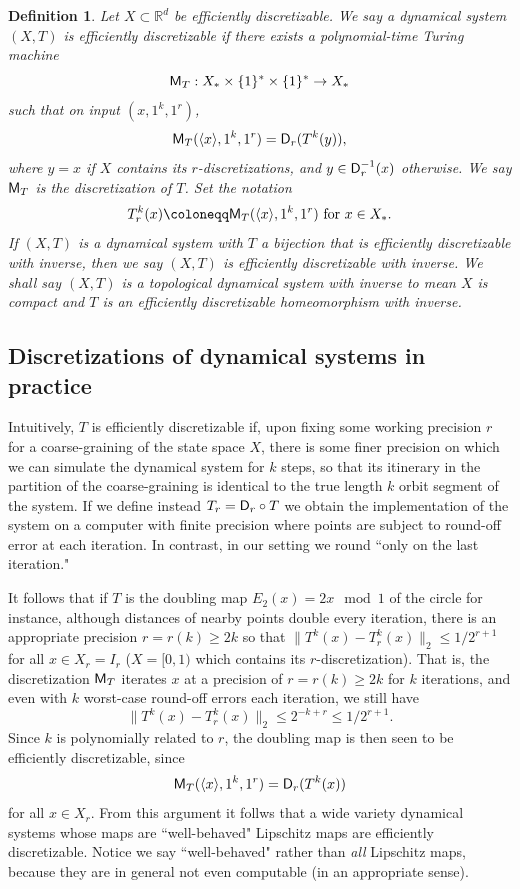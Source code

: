 \documentclass{amsart}
\theoremstyle{theorem}
\newtheorem{definition}[theorem]{Definition}
\theoremstyle{remark}
\numberwithin{equation}{section}
\newcommand{\RR}{\mathbb{R}}
\newcommand{\ccD}{\textsf{\upshape D}}
\newcommand{\ccM}{\textsf{\upshape M}}
\begin{document}
\begin{definition}\label{defDynDisc}
Let $X \subset \RR^d$ be efficiently discretizable. We say a dynamical system $(X, T)$ is \emph{efficiently discretizable} if there exists a polynomial-time Turing machine
\[\ccM_T:X_*\times \{1\}^* \times \{1\}^* \rightarrow X_*\]
such that on input $(x, 1^k,1^r)$,
\[
\ccM_T(\langle x\rangle, 1^k, 1^r)=\ccD_r(T^k(y)),
\]
where $y=x$ if $X$ contains its $r$-discretizations, and $y \in \ccD_r^{-1}(x)$ otherwise.
We say $\ccM_T$ is the \emph{discretization of $T$}. Set the notation
\[
T_r^k(x) \coloneqq \ccM_T(\langle x\rangle, 1^k, 1^r) \text{ for $x \in X_*$}.
\]
If $(X, T)$ is a dynamical system with $T$ a bijection that is efficiently discretizable with inverse, then we say $(X, T)$ is \emph{efficiently discretizable with inverse}. We shall say \emph{$(X, T)$ is a topological dynamical system with inverse} to mean $X$ is compact and $T$ is an efficiently discretizable homeomorphism with inverse.
\end{definition}


\subsection{Discretizations of dynamical systems in practice}\label{subsecMapDiscretization}

Intuitively, $T$ is efficiently discretizable if, upon fixing some working precision $r$ for a coarse-graining of the state space $X$, there is some finer precision on which we can simulate the dynamical system for $k$ steps, so that its itinerary in the partition of the coarse-graining is identical to the true length $k$ orbit segment of the system. If we define instead $T_r = \ccD_r \circ T$ we obtain the implementation of the system on a computer with finite precision where points are subject to round-off error at each iteration. In contrast, in our setting we round ``only on the last iteration."

It follows that if $T$ is the doubling map $E_2(x) = 2x \mod 1$ of the circle for instance, although distances of nearby points double every iteration, there is an appropriate precision $r=r(k) \geq 2k$ so that $\|T^{k}(x) - T_r^{k}(x)\|_2 \leq 1/2^{r+1}$ for all $x \in X_r=I_r$ ($X=[0,1)$ which contains its $r$-discretization). That is, the discretization $\ccM_T$ iterates $x$ at a precision of $r=r(k)\geq 2k$ for $k$ iterations, and even with $k$ worst-case round-off errors each iteration, we still have 
\[
\|T^{k}(x)-T_r^{k}(x)\|_2\leq 2^{-k+r} \leq 1/2^{r+1}.
\]
Since $k$ is polynomially related to $r$, the doubling map is then seen to be efficiently discretizable, since
\[
\ccM_T(\langle x\rangle, 1^k, 1^r)=\ccD_r(T^k(x))
\]
for all $x \in X_r$. From this argument it follws that a wide variety dynamical systems whose maps are ``well-behaved" Lipschitz maps are efficiently discretizable. Notice we say ``well-behaved" rather than \emph{all} Lipschitz maps, because they are in general not even computable (in an appropriate sense).
\end{document}
